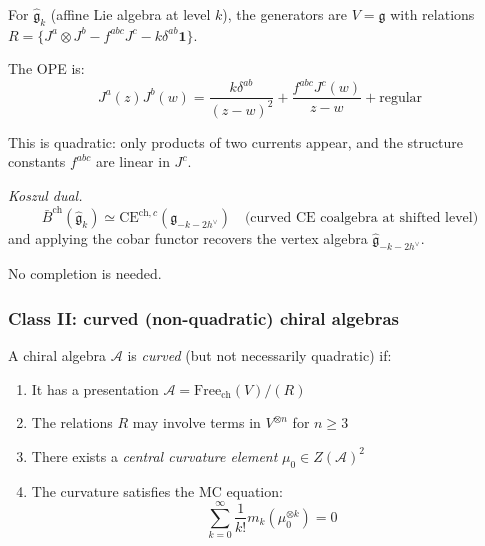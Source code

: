 \begin{example}\label{ex:km-quadratic}
For $\widehat{\mathfrak{g}}_k$ (affine Lie algebra at level $k$), the generators are $V = \mathfrak{g}$ with relations $R = \{J^a \otimes J^b - f^{abc}J^c - k \delta^{ab} \mathbf{1}\}$.

The OPE is:
\[J^a(z)J^b(w) = \frac{k \delta^{ab}}{(z-w)^2} + \frac{f^{abc}J^c(w)}{z-w} + \text{regular}\]

This is quadratic: only products of two currents appear, and the structure constants $f^{abc}$ are linear in $J^c$.

\emph{Koszul dual.}
\[\bar{B}^{\mathrm{ch}}(\widehat{\mathfrak{g}}_k) \simeq \mathrm{CE}^{\mathrm{ch},c}(\mathfrak{g}_{-k-2h^\vee})
\quad \text{(curved CE coalgebra at shifted level)}\]
and applying the cobar functor recovers the vertex algebra $\widehat{\mathfrak{g}}_{-k-2h^\vee}$.

No completion is needed.
\end{example}

\subsubsection{Class II: curved (non-quadratic) chiral algebras}

\begin{definition}\label{def:curved-chiral-detailed}
A chiral algebra $\mathcal{A}$ is \emph{curved} (but not necessarily quadratic) if:
\begin{enumerate}
\item It has a presentation $\mathcal{A} = \text{Free}_{\text{ch}}(V) / (R)$
\item The relations $R$ may involve terms in $V^{\otimes n}$ for $n \geq 3$
\item There exists a \emph{central curvature element} $\mu_0 \in Z(\mathcal{A})^2$
\item The curvature satisfies the MC equation: 
\[\sum_{k=0}^\infty \frac{1}{k!} m_k(\mu_0^{\otimes k}) = 0\]
\end{enumerate}
\end{definition}

